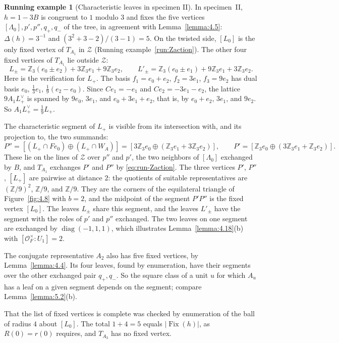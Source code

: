 \documentclass[12pt,letterpaper]{amsart}
\numberwithin{equation}{section}
\theoremstyle{definition}
\newtheorem{runex}[theorem]{Running example}
\theoremstyle{plain}
\providecommand{\cal}{\mathcal}
\def\off{{\cal O}_F}
\begin{document}
\begin{runex}[Characteristic leaves in specimen II]
\label{run:leaves}
In specimen~II, $h=1-3B$ is congruent to $1$ modulo $3$ and fixes the
five vertices $[\Lambda_0],p',p'',q_+,q_-$ of the tree, in agreement
with Lemma~\ref{lemma:4.5}: $\Delta(h)=3^{-1}$ and
$(3^2+3-2)/(3-1)=5$. On the twisted side, $[L_0]$ is the only fixed
vertex of $T_{A_1}$ in $\mathcal Z$ (Running example~\ref{run:Zaction}).
The other four fixed vertices of $T_{A_1}$ lie outside $\mathcal Z$:
\[
 L_\pm=\mathbb Z_3(e_0\pm e_2)+3\mathbb Z_3e_1+9\mathbb Z_3e_2,
 \qquad
 L'_\pm=\mathbb Z_3(e_0\pm e_1)+9\mathbb Z_3e_1+3\mathbb Z_3e_2 .
\]
Here is the verification for $L_+$. The basis
$f_1=e_0+e_2$, $f_2=3e_1$, $f_3=9e_2$ has dual basis
$e_0$, $\tfrac13e_1$, $\tfrac19(e_2-e_0)$. Since $Ce_1=-e_1$ and
$Ce_2=-3e_1-e_2$, the lattice $9A_1L_+^\vee$ is spanned by
$9e_0$, $3e_1$, and $e_0+3e_1+e_2$, that is, by $e_0+e_2$, $3e_1$,
and $9e_2$. So $A_1L_+^\vee=\tfrac19L_+$.

The characteristic segment of $L_+$ is visible from its intersection
with, and its projection to, the two summands:
\[
 P''=[(L_+\cap Fe_0)\oplus(L_+\cap W_A)]
    =[3\mathbb Z_3e_0\oplus(\mathbb Z_3e_1+3\mathbb Z_3e_2)],
 \qquad
 P'=[\mathbb Z_3e_0\oplus(3\mathbb Z_3e_1+\mathbb Z_3e_2)].
\]
These lie on the lines of $\mathcal Z$ over $p''$ and $p'$, the two
neighbors of $[\Lambda_0]$ exchanged by $B$, and
$T_{A_1}$ exchanges $P'$ and $P''$ by \eqref{eq:run-Zaction}. The
three vertices $P'$, $P''$, $[L_+]$ are pairwise at distance $2$:
the quotients of suitable representatives are
$(\mathbb Z/9)^2$, $\mathbb Z/9$, and $\mathbb Z/9$. They are the
corners of the equilateral triangle of Figure~\ref{fig:4.8} with
$b=2$, and the midpoint of the segment $P'P''$ is the fixed vertex $[L_0]$. The leaves $L_\pm$ share this segment, and the leaves
$L'_\pm$ have the segment with the roles of $p'$ and $p''$ exchanged.
The two leaves on one segment are exchanged by
$\operatorname{diag}(-1,1,1)$, which illustrates
Lemma~\ref{lemma:4.18}(b) with $[\off^\times:U_1]=2$.

The conjugate representative $A_2$ also has five fixed vertices, by
Lemma~\ref{lemma:4.4}. Its four leaves, found by enumeration, have
their segments over the other exchanged pair $q_+,q_-$. So the square
class of a unit $u$ for which $A_u$ has a leaf on a given segment
depends on the segment; compare Lemma~\ref{lemma:5.2}(b).

That the list of fixed vertices is complete was checked by
enumeration of the ball of radius $4$ about $[L_0]$. The total
$1+4=5$ equals $|\operatorname{Fix}(h)|$, as $R(0)=r(0)$ requires,
and $T_{A_3}$ has no fixed vertex.
\end{runex}
\end{document}
